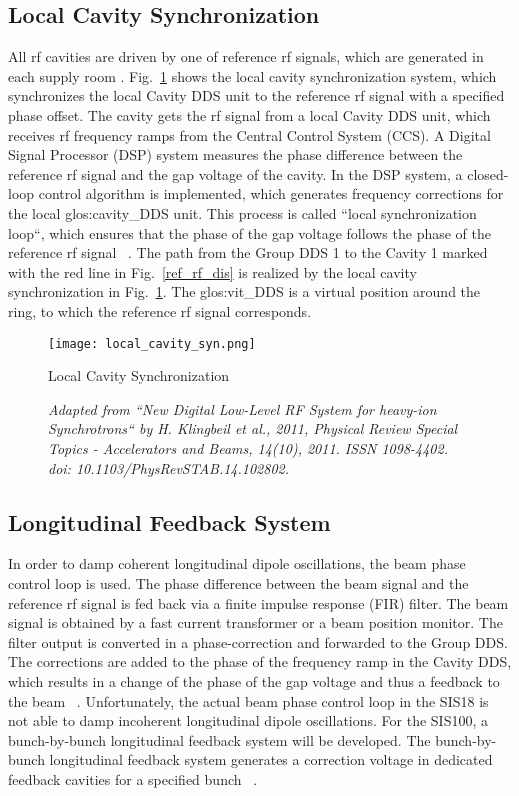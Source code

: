 \subsection{Local Cavity Synchronization}
All rf cavities are driven by one of reference rf signals, which are generated in each supply room . Fig.~\ref{local_cavity_syn} shows the local cavity synchronization system, which synchronizes the local Cavity DDS unit to the reference rf signal with a specified phase offset. The cavity gets the rf signal from a local Cavity \gls{DDS} unit, which receives rf frequency ramps from the Central Control System (\gls{CCS}). A Digital Signal Processor (\gls{DSP}) system measures the phase difference between the reference rf signal and the gap voltage of the cavity. In the DSP system, a closed-loop control algorithm is implemented, which generates frequency corrections for the local \gls{glos:cavity_DDS} unit. This process is called ``local synchronization loop``, which ensures that the phase of the gap voltage follows the phase of the reference rf signal ~\cite{klingbeil_new_2011}. The path from the Group DDS 1 to the Cavity 1 marked with the red line in Fig.~\ref{ref_rf_dis} is realized by the local cavity synchronization in Fig.~\ref{local_cavity_syn}. The \gls{glos:vit_DDS} is a virtual position around the ring, to which the reference rf signal corresponds.
\begin{figure}[H]
   \centering   
   \texttt{[image: local\_cavity\_syn.png]}
   \caption{Local Cavity Synchronization}
   \caption*{\textsl{\small{Adapted from ``New Digital Low-Level RF System for heavy-ion Synchrotrons`` by H. Klingbeil et al., 2011, Physical Review Special Topics - Accelerators and Beams, 14(10), 2011. ISSN 1098-4402. doi: 10.1103/PhysRevSTAB.14.102802.}}}
   \label{local_cavity_syn}
\end{figure}
\subsection{Longitudinal Feedback System}
In order to damp coherent longitudinal dipole oscillations, the beam phase control loop is used. The phase difference between the beam signal and the reference rf signal is fed back via a finite impulse response (FIR) filter. The beam signal is obtained by a fast current transformer or a beam position monitor. The filter output is converted in a phase-correction and forwarded to the Group DDS. The corrections are added to the phase of the  frequency ramp in the Cavity DDS, which results in a change of the phase of the gap voltage and thus a feedback to the beam ~\cite{baudrenghien_lecture_2010}. Unfortunately, the actual beam phase control loop in the SIS18 is not able to damp incoherent longitudinal dipole oscillations. For the SIS100, a bunch-by-bunch longitudinal feedback system will be developed. The bunch-by-bunch longitudinal feedback system generates a correction voltage in dedicated feedback cavities for a specified bunch ~\cite{gross_bunch-by-bunch_2015}. 

